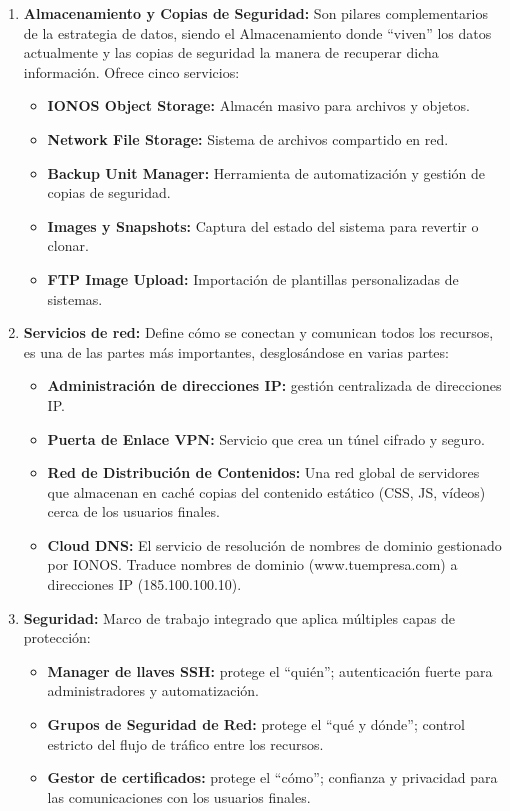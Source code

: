 \begin{enumerate}
    \item \textbf{ Almacenamiento y Copias de Seguridad:} Son pilares complementarios de la estrategia de datos, siendo el Almacenamiento donde ``viven'' los datos actualmente y las copias de seguridad la manera de recuperar dicha información. Ofrece cinco servicios:
          \begin{itemize}
              \item \textbf{ IONOS Object Storage: } Almacén masivo para archivos y objetos.
              \item \textbf{ Network File Storage: } Sistema de archivos compartido en red.
              \item \textbf{ Backup Unit Manager: } Herramienta de automatización y gestión de copias de seguridad.
              \item \textbf{ Images y Snapshots: } Captura del estado del sistema para revertir o clonar.
              \item \textbf{ FTP Image Upload: } Importación de plantillas personalizadas de sistemas.
          \end{itemize}
    \item \textbf{Servicios de red: } Define cómo se conectan y comunican todos los recursos, es una de las partes más importantes, desglosándose en varias partes:
          \begin{itemize}
              \item \textbf{Administración de direcciones IP: } gestión centralizada de direcciones IP.
              \item \textbf{Puerta de Enlace VPN: }  Servicio que crea un túnel cifrado y seguro.
              \item \textbf{Red de Distribución de Contenidos: } Una red global de servidores que almacenan en caché copias del contenido estático (CSS, JS, vídeos) cerca de los usuarios finales.
              \item \textbf{Cloud DNS: } El servicio de resolución de nombres de dominio gestionado por IONOS. Traduce nombres de dominio (www.tuempresa.com) a direcciones IP (185.100.100.10).
          \end{itemize}
    \item \textbf{Seguridad: } Marco de trabajo integrado que aplica múltiples capas de protección:
          \begin{itemize}
              \item \textbf{Manager de llaves SSH:} protege el ``quién''; autenticación fuerte para administradores y automatización.
              \item \textbf{Grupos de Seguridad de Red:} protege el ``qué y dónde''; control estricto del flujo de tráfico entre los recursos.
              \item \textbf{ Gestor de certificados: } protege el ``cómo''; confianza y privacidad para las comunicaciones con los usuarios finales.
          \end{itemize}
\end{enumerate}

